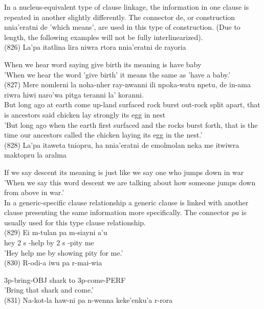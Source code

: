 \documentclass[10pt]{article}
\begin{document}
In a nucleus-equivalent type of clause linkage, the information in one clause is repeated in another slightly differently. The connector de, or construction nnia'eratni de 'which means', are used in this type of construction. (Due to length, the following examples will not be fully interlinearized).\\
(826) La'pa itatlina lira niwra rtora nnia'eratni de rayoria

When we hear word saying give birth its meaning is have baby\\
'When we hear the word 'give birth' it means the same as 'have a baby.'\\
(827) Mere nomlerni la noha-nher ray-nwanni ili npoka-watu npetu, de in-ama riwra hiwi naro'wa pitga teranni la' koranni.\\
But long ago at earth come up-land surfaced rock burst out-rock split apart, that is ancestors said chicken lay strongly its egg in nest\\
'But long ago when the earth first surfaced and the rocks burst forth, that is the time our ancestors called the chicken laying its egg in the nest.'\\
(828) La'pa itaweta tniopru, ha nnia'eratni de emolmolan neka me itwiwra maktopru la aralma

If we say descent its meaning is just like we say one who jumps down in war\\
'When we say this word descent we are talking about how someone jumps down from above in war.'\\
In a generic-specific clause relationship a generic clause is linked with another clause presenting the same information more specifically. The connector \(p a\) is usually used for this type clause relationship.\\
(829) Ei m-tulan pa m-siayni a'u\\
hey 2 s -help by 2 s -pity me\\
'Hey help me by showing pity for me.'\\
(830) R-odi-a iwu pa r-mai-wia

3p-bring-OBJ shark to 3p-come-PERF\\
'Bring that shark and come.'\\
(831) Na-kot-la haw-ni pa n-wenna keke'enku'a r-rora
\end{document}
